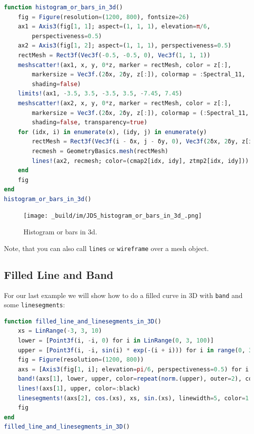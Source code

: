 \documentclass[
  notoc %
]{tufte-book}
\newcommand{\passthrough}[1]{#1}
\begin{document}
\begin{lstlisting}[language=Julia]
function histogram_or_bars_in_3d()
    fig = Figure(resolution=(1200, 800), fontsize=26)
    ax1 = Axis3(fig[1, 1]; aspect=(1, 1, 1), elevation=π/6,
        perspectiveness=0.5)
    ax2 = Axis3(fig[1, 2]; aspect=(1, 1, 1), perspectiveness=0.5)
    rectMesh = Rect3f(Vec3f(-0.5, -0.5, 0), Vec3f(1, 1, 1))
    meshscatter!(ax1, x, y, 0*z, marker = rectMesh, color = z[:],
        markersize = Vec3f.(2δx, 2δy, z[:]), colormap = :Spectral_11,
        shading=false)
    limits!(ax1, -3.5, 3.5, -3.5, 3.5, -7.45, 7.45)
    meshscatter!(ax2, x, y, 0*z, marker = rectMesh, color = z[:],
        markersize = Vec3f.(2δx, 2δy, z[:]), colormap = (:Spectral_11, 0.25),
        shading=false, transparency=true)
    for (idx, i) in enumerate(x), (idy, j) in enumerate(y)
        rectMesh = Rect3f(Vec3f(i - δx, j - δy, 0), Vec3f(2δx, 2δy, z[idx, idy]))
        recmesh = GeometryBasics.mesh(rectMesh)
        lines!(ax2, recmesh; color=(cmap2[idx, idy], ztmp2[idx, idy]))
    end
    fig
end
histogram_or_bars_in_3d()
\end{lstlisting}

\begin{figure}
\hypertarget{fig:histogram_or_bars_in_3d}{%
\centering
\texttt{[image: \_build/im/JDS\_histogram\_or\_bars\_in\_3d\_.png]}
\caption{Histogram or bars in 3d.}\label{fig:histogram_or_bars_in_3d}
}
\end{figure}

Note, that you can also call \passthrough{\lstinline!lines!} or
\passthrough{\lstinline!wireframe!} over a mesh object.

\hypertarget{filled-line-and-band}{%
\subsection{Filled Line and Band}\label{filled-line-and-band}}

For our last example we will show how to do a filled curve in 3D with
\passthrough{\lstinline!band!} and some
\passthrough{\lstinline!linesegments!}:

\begin{lstlisting}[language=Julia]
function filled_line_and_linesegments_in_3D()
    xs = LinRange(-3, 3, 10)
    lower = [Point3f(i, -i, 0) for i in LinRange(0, 3, 100)]
    upper = [Point3f(i, -i, sin(i) * exp(-(i + i))) for i in range(0, 3, length=100)]
    fig = Figure(resolution=(1200, 800))
    axs = [Axis3(fig[1, i]; elevation=pi/6, perspectiveness=0.5) for i = 1:2]
    band!(axs[1], lower, upper, color=repeat(norm.(upper), outer=2), colormap=:CMRmap)
    lines!(axs[1], upper, color=:black)
    linesegments!(axs[2], cos.(xs), xs, sin.(xs), linewidth=5, color=1:length(xs))
    fig
end
filled_line_and_linesegments_in_3D()
\end{lstlisting}
\end{document}
